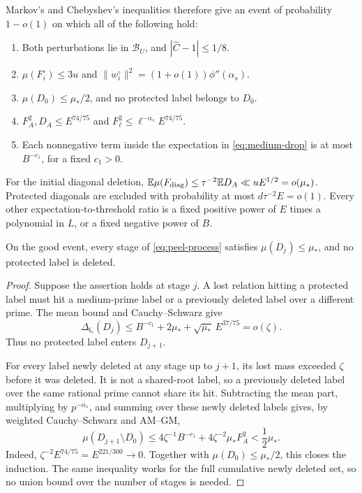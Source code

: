 Markov's and Chebyshev's inequalities therefore give an event of
probability \(1-o(1)\) on which all of the following hold:
\begin{enumerate}[label=(\roman*)]
\item Both perturbations lie in \(\mathcal B_U\), and
\(|\widehat C-1|\le1/8\).
\item \(\mu(F_i^\circ)\le3u\) and
\(\|w_i^\circ\|^2=(1+o(1))\phi''(\alpha_s)\).
\item \(\mu(D_0)\le\mu_*/2\), and no protected label belongs to
\(D_0\).
\item \(F_A^2,D_A\le E^{74/75}\) and
\(F_\ell^2\le\ell^{-\alpha_s}E^{74/75}\).
\item Each nonnegative term inside the expectation in
\eqref{eq:medium-drop} is at most \(B^{-c_1}\), for a fixed
\(c_1>0\).
\end{enumerate}
For the initial diagonal deletion,
\(\mathbb E\mu(F_{\rm diag})\le\tau^{-2}\mathbb ED_A\ll uE^{1/2}
=o(\mu_*)\).  Protected diagonals are excluded with probability at
most \(d\tau^{-2}E=o(1)\).  Every other expectation-to-threshold
ratio is a fixed positive power of \(E\) times a polynomial in
\(L\), or a fixed negative power of \(B\).

\begin{lemma}\label{lem:peeling}
On the good event, every stage of \eqref{eq:peel-process} satisfies
\(\mu(D_j)\le\mu_*\), and no protected label is deleted.
\end{lemma}

\begin{proof}
Suppose the assertion holds at stage \(j\).  A lost relation hitting
a protected label must hit a medium-prime label or a previously
deleted label over a different prime.  The mean bound and
Cauchy--Schwarz give
\[
 \Delta_{\mathfrak l_s}(D_j)
 \le B^{-c_1}+2\mu_*+\sqrt{\mu_*}\,E^{37/75}=o(\zeta).
\]
Thus no protected label enters \(D_{j+1}\).

For every label newly deleted at any stage up to \(j+1\), its
lost mass exceeded \(\zeta\) before it was deleted.  It is not a
shared-root label, so a previously deleted label over the same
rational prime cannot share its hit.  Subtracting the mean part,
multiplying by \(p^{-\alpha_s}\), and summing over these newly
deleted labels gives, by weighted Cauchy--Schwarz and AM--GM,
\begin{equation}\label{eq:peel-invariant-bound}
 \mu(D_{j+1}\setminus D_0)
 \le4\zeta^{-1}B^{-c_1}
       +4\zeta^{-2}\mu_*F_A^2
 <\frac12\mu_*.
\end{equation}
Indeed, \(\zeta^{-2}E^{74/75}=E^{221/300}\to0\).
Together with \(\mu(D_0)\le\mu_*/2\), this closes the induction.
The same inequality works for the full cumulative newly deleted
set, so no union bound over the number of stages is needed.
\end{proof}

